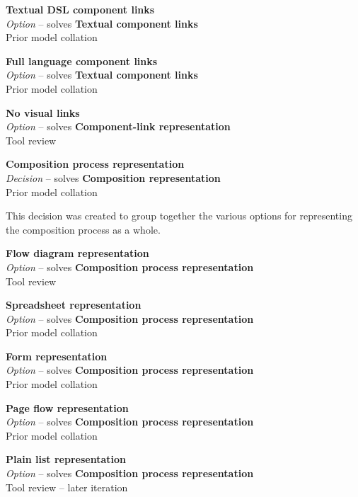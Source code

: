 \textbf{Textual DSL component links} \\ \emph{Option} -- solves \textbf{Textual component links} \\ Prior model collation \cite{Aghaee2012}

\textbf{Full language component links} \\ \emph{Option} -- solves \textbf{Textual component links} \\ Prior model collation \cite{Fischer2009}

\textbf{No visual links} \\ \emph{Option} -- solves \textbf{Component-link representation} \\ Tool review
		
\textbf{Composition process representation} \\ \emph{Decision} -- solves \textbf{Composition representation} \\ Prior model collation

This decision was created to group together the various options for representing the composition process as a whole.

\textbf{Flow diagram representation} \\ \emph{Option} -- solves \textbf{Composition process representation} \\ Tool review

\textbf{Spreadsheet representation} \\ \emph{Option} -- solves \textbf{Composition process representation} \\ Prior model collation \cite{Aghaee2012,Minhas2012,Fischer2009}


\textbf{Form representation} \\ \emph{Option} -- solves \textbf{Composition process representation} \\ Prior model collation \cite{Aghaee2012}

\textbf{Page flow representation} \\ \emph{Option} -- solves \textbf{Composition process representation} \\ Prior model collation \cite{Pietschmann2010}

\textbf{Plain list representation} \\ \emph{Option} -- solves \textbf{Composition process representation} \\ Tool review  -- later iteration

